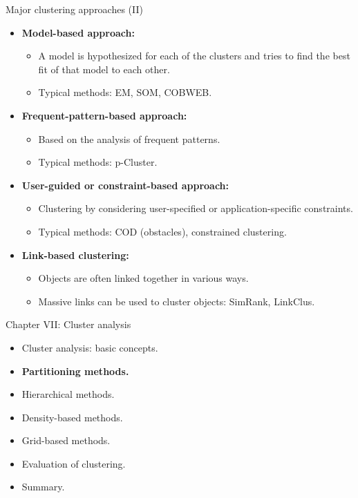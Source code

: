 \documentclass[aspectratio=169,t,xcolor=dvipsnames]{beamer}
\begin{document}
  {
    \begin{frame}{Major clustering approaches (II)}
        \begin{itemize}
          \item \textbf{Model-based approach:}
          \begin{itemize}
            \item A model is hypothesized for each of the clusters and tries to find the best fit of that model to each other.
            \item Typical methods: EM, SOM, COBWEB.
          \end{itemize}
          \item \textbf{Frequent-pattern-based approach:}
          \begin{itemize}
            \item Based on the analysis of frequent patterns.
            \item Typical methods: p-Cluster.
          \end{itemize}
          \item \textbf{User-guided or constraint-based approach:}
          \begin{itemize}
            \item Clustering by considering user-specified or application-specific constraints.
            \item Typical methods: COD (obstacles), constrained clustering.
          \end{itemize}
          \item \textbf{Link-based clustering:}
          \begin{itemize}
            \item Objects are often linked together in various ways.
            \item Massive links can be used to cluster objects: SimRank, LinkClus.
          \end{itemize}
        \end{itemize}
    \end{frame}
  }

  {
    \begin{frame}{Chapter VII: Cluster analysis}
        \begin{itemize}
            \item Cluster analysis: basic concepts.
            \item \textbf{Partitioning methods.}
            \item Hierarchical methods.
            \item Density-based methods.
            \item Grid-based methods.
            \item Evaluation of clustering.
            \item Summary.
        \end{itemize}
    \end{frame}
  }
\end{document}
